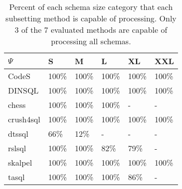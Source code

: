 \begin{table}
\caption{Percent of each schema size category that each subsetting method is capable of processing. Only 3 of the 7 evaluated methods are capable of processing all schemas.}
\label{tab:schema-size-limits}
\begin{tabular}{llllll}
\toprule
$\Psi$ & S & M & L & XL & XXL \\
\midrule
CodeS & 100\% & 100\% & 100\% & 100\% & 100\% \\
DINSQL & 100\% & 100\% & 100\% & 100\% & 100\% \\
chess & 100\% & 100\% & 100\% & - & - \\
crush4sql & 100\% & 100\% & 100\% & 100\% & 100\% \\
dtssql & 66\% & 12\% & - & - & - \\
rslsql & 100\% & 100\% & 82\% & 79\% & - \\
skalpel & 100\% & 100\% & 100\% & 100\% & 100\% \\
tasql & 100\% & 100\% & 100\% & 86\% & - \\
\bottomrule
\end{tabular}
\end{table}
